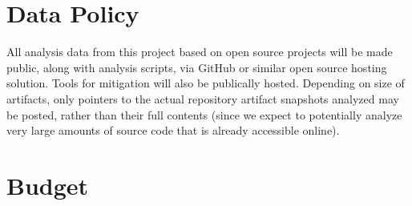 \documentclass[10pt]{article}
\begin{document}



\section{Data Policy}

All analysis data from this project based on open source projects will be made public, along with analysis scripts, via GitHub or similar open source hosting solution.  Tools for mitigation will also be publically hosted.  Depending on size of artifacts, only pointers to the actual repository artifact snapshots analyzed may be posted, rather than their full contents (since we expect to potentially analyze very large amounts of source code that is already accessible online).

\section{Budget}
\end{document}
